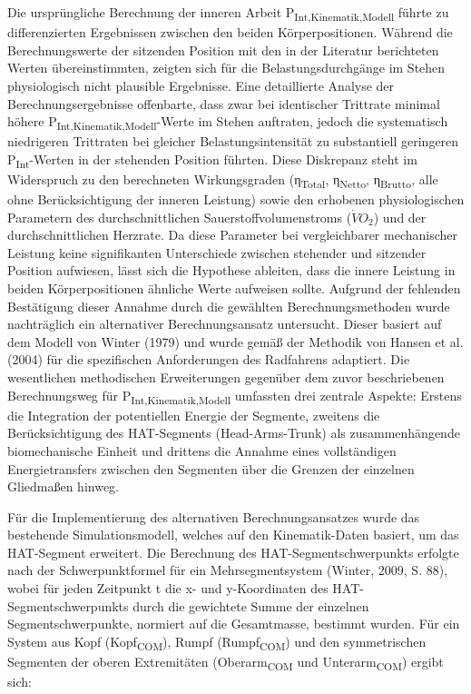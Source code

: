 \documentclass[
  letterpaper,
  DIV=11]{scrartcl}
\begin{document}
Die ursprüngliche Berechnung der inneren Arbeit
P\textsubscript{Int,Kinematik,Modell} führte zu differenzierten
Ergebnissen zwischen den beiden Körperpositionen. Während die
Berechnungswerte der sitzenden Position mit den in der Literatur
berichteten Werten übereinstimmten, zeigten sich für die
Belastungsdurchgänge im Stehen physiologisch nicht plausible Ergebnisse.
Eine detaillierte Analyse der Berechnungsergebnisse offenbarte, dass
zwar bei identischer Trittrate minimal höhere
P\textsubscript{Int,Kinematik,Modell}-Werte im Stehen auftraten, jedoch
die systematisch niedrigeren Trittraten bei gleicher
Belastungsintensität zu substantiell geringeren
P\textsubscript{Int}-Werten in der stehenden Position führten. Diese
Diskrepanz steht im Widerspruch zu den berechneten Wirkungsgraden
(η\textsubscript{Total}, η\textsubscript{Netto},
η\textsubscript{Brutto}, alle ohne Berücksichtigung der inneren
Leistung) sowie den erhobenen physiologischen Parametern des
durchschnittlichen Sauerstoffvolumenstroms (\(\dot{V}O_2\)) und der
durchschnittlichen Herzrate. Da diese Parameter bei vergleichbarer
mechanischer Leistung keine signifikanten Unterschiede zwischen
stehender und sitzender Position aufwiesen, lässt sich die Hypothese
ableiten, dass die innere Leistung in beiden Körperpositionen ähnliche
Werte aufweisen sollte. Aufgrund der fehlenden Bestätigung dieser
Annahme durch die gewählten Berechnungsmethoden wurde nachträglich ein
alternativer Berechnungsansatz untersucht. Dieser basiert auf dem Modell
von Winter (1979) und wurde gemäß der Methodik von Hansen et al. (2004)
für die spezifischen Anforderungen des Radfahrens adaptiert. Die
wesentlichen methodischen Erweiterungen gegenüber dem zuvor
beschriebenen Berechnungsweg für P\textsubscript{Int,Kinematik,Modell}
umfassten drei zentrale Aspekte: Erstens die Integration der
potentiellen Energie der Segmente, zweitens die Berücksichtigung des
HAT-Segments (Head-Arms-Trunk) als zusammenhängende biomechanische
Einheit und drittens die Annahme eines vollständigen Energietransfers
zwischen den Segmenten über die Grenzen der einzelnen Gliedmaßen hinweg.

Für die Implementierung des alternativen Berechnungsansatzes wurde das
bestehende Simulationsmodell, welches auf den Kinematik-Daten basiert,
um das HAT-Segment erweitert. Die Berechnung des HAT-Segmentschwerpunkts
erfolgte nach der Schwerpunktformel für ein Mehrsegmentsystem (Winter,
2009, S. 88), wobei für jeden Zeitpunkt t die x- und y-Koordinaten des
HAT-Segmentschwerpunkts durch die gewichtete Summe der einzelnen
Segmentschwerpunkte, normiert auf die Gesamtmasse, bestimmt wurden. Für
ein System aus Kopf (Kopf\textsubscript{COM}), Rumpf
(Rumpf\textsubscript{COM}) und den symmetrischen Segmenten der oberen
Extremitäten (Oberarm\textsubscript{COM} und
Unterarm\textsubscript{COM}) ergibt sich:
\end{document}
